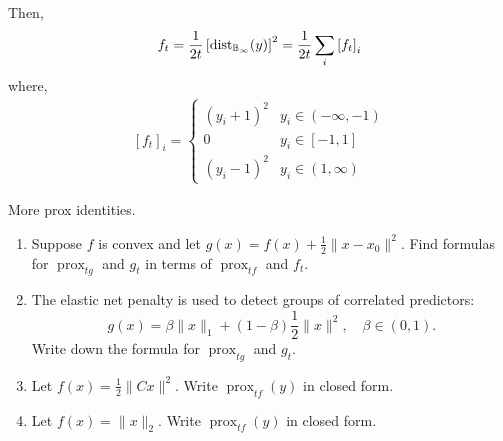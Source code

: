 \documentclass[10pt]{article}
\newcommand{\prox}{\operatorname{prox}}
\begin{document}
\begin{solution}[Solution]
\begin{enumerate}[label=(\alph*)]
    Then,
    \begin{align*}
        f_t = \frac{1}{2t}\left[\operatorname{dist}_{\mathbb{B}_\infty} (y) \right]^2 = 
        \frac{1}{2t}\sum_{i} \left[f_t\right]_i
    \end{align*}
    where,
    \begin{align*}
        \left[ f_t \right]_i = 
        \begin{cases}
            (y_i+1)^2 & y_i\in(-\infty,-1) \\
            0 & y_i \in [-1,1] \\
            (y_i - 1)^2 & y_i \in(1,\infty)
        \end{cases}
    \end{align*}
    

\end{enumerate}

\end{solution}


\begin{problem}[Problem 3]
More prox identities. 
\vskip 16pt
\begin{enumerate}[label=(\alph*)]
\item Suppose \( f \) is convex and let \( g(x) = f(x) + \frac{1}{2}\|x-x_0\|^2 \). 
Find formulas for \( \prox_{t g} \) and \( g_t \) in terms of \( \prox_{t f} \) and \( f_t \).
\item The elastic net penalty is used to detect groups of correlated predictors:
\[
g(x) = \beta \|x\|_1 + (1-\beta) \frac{1}{2}\|x\|^2, \quad \beta \in (0,1).
\] 
Write down the formula for \( \prox_{t g} \) and \( g_t \).
\item Let \( f(x) = \frac{1}{2}\|Cx\|^2 \). Write \( \prox_{t f}(y) \) in closed form.
\item Let \( f(x) = \|x\|_2 \). Write \( \prox_{tf}(y) \) in closed form.
\end{enumerate}
\end{problem}
\end{document}
